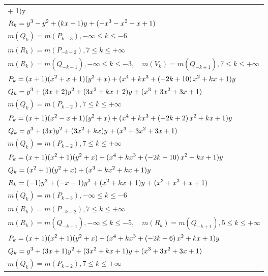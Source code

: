\documentclass{amsart}
\begin{document}
\begin{longtable}{|l|}
 + 1)y\)\\
\(\displaystyle R_k=y^{3}-y^{2}+(k\*x
 - 1)y^{}+(-x^3
 - x^2
 + x
 + 1)\)\\
\(\displaystyle m(Q_k) = m(P_{k
 - 3}),-\infty \leqslant k \leqslant -6\)\\
\(\displaystyle m(R_k) = m(P_{-k
 - 2}),7 \leqslant k \leqslant +\infty\)\\
\(\displaystyle m(R_k) = m(Q_{-k
 + 1}),-\infty \leqslant k \leqslant -3,\quad m(V_k) = m(Q_{-k
 + 1}),7 \leqslant k \leqslant +\infty\)\\
\hline
\(\displaystyle P_k=(x
 + 1)(x^2
 + x
 + 1)(y^2+x)+(x^4
 + k\*x^3
 + \left(-2\*k
 + 10\right) \*x^2
 + k\*x
 + 1)y\)\\
\(\displaystyle Q_k=y^{3}+(3\*x
 + 2)y^{2}+(3\*x^2
 + k\*x
 + 2)y^{}+(x^3
 + 3\*x^2
 + 3\*x
 + 1)\)\\
\(\displaystyle m(Q_k) = m(P_{k
 - 2}),7 \leqslant k \leqslant +\infty\)\\
\hline
\(\displaystyle P_k=(x
 + 1)(x^2
 - x
 + 1)(y^2+x)+(x^4
 + k\*x^3
 + \left(-2\*k
 + 2\right) \*x^2
 + k\*x
 + 1)y\)\\
\(\displaystyle Q_k=y^{3}+(3\*x)y^{2}+(3\*x^2
 + k\*x)y^{}+(x^3
 + 3\*x^2
 + 3\*x
 + 1)\)\\
\(\displaystyle m(Q_k) = m(P_{k
 - 2}),7 \leqslant k \leqslant +\infty\)\\
\hline
\(\displaystyle P_k=(x
 + 1)(x^2
 + 1)(y^2+x)+(x^4
 + k\*x^3
 + \left(-2\*k
 - 10\right) \*x^2
 + k\*x
 + 1)y\)\\
\(\displaystyle Q_k=(x^2
 + 1)(y^2+x)+(x^3
 + k\*x^2
 + k\*x
 + 1)y\)\\
\(\displaystyle R_k=(-1)y^{3}+(-x
 - 1)y^{2}+(x^2
 + k\*x
 + 1)y^{}+(x^3
 + x^2
 + x
 + 1)\)\\
\(\displaystyle m(Q_k) = m(P_{k
 - 3}),-\infty \leqslant k \leqslant -6\)\\
\(\displaystyle m(R_k) = m(P_{-k
 - 2}),7 \leqslant k \leqslant +\infty\)\\
\(\displaystyle m(R_k) = m(Q_{-k
 + 1}),-\infty \leqslant k \leqslant -5,\quad m(R_k) = m(Q_{-k
 + 1}),5 \leqslant k \leqslant +\infty\)\\
\hline
\(\displaystyle P_k=(x
 + 1)(x^2
 + 1)(y^2+x)+(x^4
 + k\*x^3
 + \left(-2\*k
 + 6\right) \*x^2
 + k\*x
 + 1)y\)\\
\(\displaystyle Q_k=y^{3}+(3\*x
 + 1)y^{2}+(3\*x^2
 + k\*x
 + 1)y^{}+(x^3
 + 3\*x^2
 + 3\*x
 + 1)\)\\
\(\displaystyle m(Q_k) = m(P_{k
 - 2}),7 \leqslant k \leqslant +\infty\)\\

\end{longtable}
\end{document}
